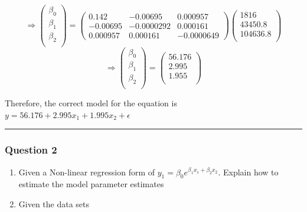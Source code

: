 \documentclass[
]{article}
\begin{document}
\begin{equation*}
\Rightarrow
\begin{pmatrix}
    \beta_0\\
    \beta_1\\
    \beta_2\\
  \end{pmatrix}
=
  \begin{pmatrix}
    0.142 & -0.00695 & 0.000957 \\
    -0.00695 & -0.0000292 & 0.000161 \\
    0.000957 & 0.000161 & -0.0000649
  \end{pmatrix}
  
  \begin{pmatrix}
    1816\\
    43450.8\\
    104636.8\\
  \end{pmatrix}

\end{equation*} \begin{equation*}
  \Rightarrow
    \begin{pmatrix}
      \beta_0\\
      \beta_1\\
      \beta_2\\
    \end{pmatrix}
  =
    \begin{pmatrix}
      56.176\\
      2.995\\
      1.955\\
    \end{pmatrix}
\end{equation*}

Therefore, the correct model for the equation is
\(y = 56.176 + 2.995x_1 + 1.995x_2 + \epsilon\)

\begin{center}\rule{0.5\linewidth}{0.5pt}\end{center}

\subsubsection{Question 2}\label{question-2}

\begin{enumerate}
\def\labelenumi{(\alph{enumi})}
\item
  Given a Non-linear regression form of
  \(y_1 = \beta_0 e^{\beta_1x_1 +\beta_2x_2}\). Explain how to estimate
  the model parameter estimates
\item
  Given the data sets
\end{enumerate}
\end{document}
